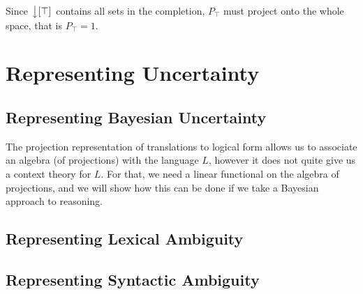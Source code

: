 \documentclass[12pt]{report}
\begin{document}
Since $\left\downarrow[\top]\right.$ contains all sets in the completion, $P_\top$ must project onto the whole space, that is $P_\top = 1$.

\section{Representing Uncertainty}

\subsection{Representing Bayesian Uncertainty}

The projection representation of translations to logical form allows us to associate an algebra (of projections) with the language $L$, however it does not quite give us a context theory for $L$. For that, we need a linear functional on the algebra of projections, and we will show how this can be done if we take a Bayesian approach to reasoning.


\subsection{Representing Lexical Ambiguity}

\subsection{Representing Syntactic Ambiguity}
\end{document}
